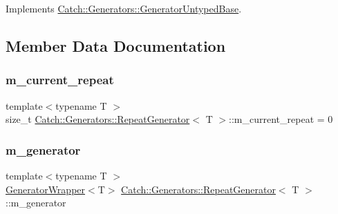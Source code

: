 Implements \mbox{\hyperlink{class_catch_1_1_generators_1_1_generator_untyped_base_aeed3c0cd6233c5f553549e453b8d6638}{Catch\+::\+Generators\+::\+Generator\+Untyped\+Base}}.



\subsection{Member Data Documentation}
\mbox{\label{class_catch_1_1_generators_1_1_repeat_generator_ad834535fe3a2aec44bf53632c43f68cf}} 
\subsubsection{\texorpdfstring{m\_current\_repeat}{m\_current\_repeat}}
{\footnotesize\ttfamily template$<$typename T $>$ \\
size\+\_\+t \mbox{\hyperlink{class_catch_1_1_generators_1_1_repeat_generator}{Catch\+::\+Generators\+::\+Repeat\+Generator}}$<$ T $>$\+::m\+\_\+current\+\_\+repeat = 0\hspace{0.3cm}{\ttfamily [private]}}

\mbox{\label{class_catch_1_1_generators_1_1_repeat_generator_ae4eeba772ffba6d928f959835e8db154}} 
\subsubsection{\texorpdfstring{m\_generator}{m\_generator}}
{\footnotesize\ttfamily template$<$typename T $>$ \\
\mbox{\hyperlink{class_catch_1_1_generators_1_1_generator_wrapper}{Generator\+Wrapper}}$<$T$>$ \mbox{\hyperlink{class_catch_1_1_generators_1_1_repeat_generator}{Catch\+::\+Generators\+::\+Repeat\+Generator}}$<$ T $>$\+::m\+\_\+generator\hspace{0.3cm}{\ttfamily [private]}}

